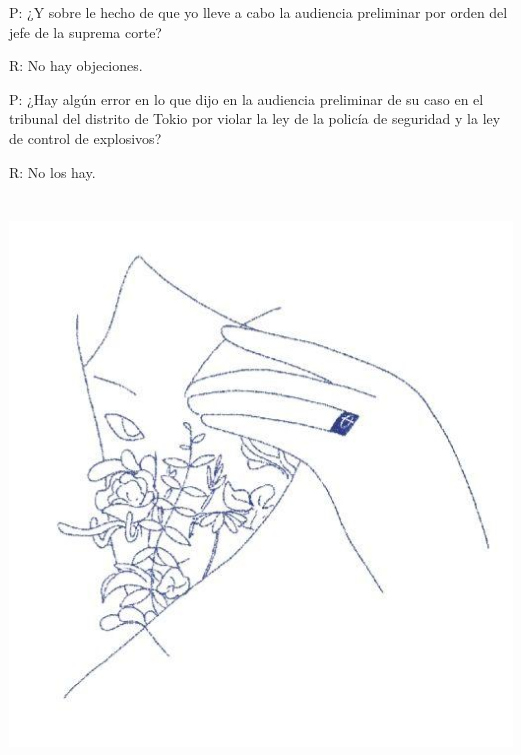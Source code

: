 \documentclass[
]{book}
\begin{document}
P: ¿Y sobre le hecho de que yo lleve a cabo la audiencia preliminar por orden del jefe de la suprema corte?

R: No hay objeciones.

P: ¿Hay algún error en lo que dijo en la audiencia preliminar de su caso en el tribunal del distrito de Tokio por violar la ley de la policía de seguridad y la ley de control de explosivos?

R: No los hay.

\hypertarget{section-1}{%
\chapter*{}\label{section-1}}

\includegraphics{images/contra.jpg}

  
\end{document}
